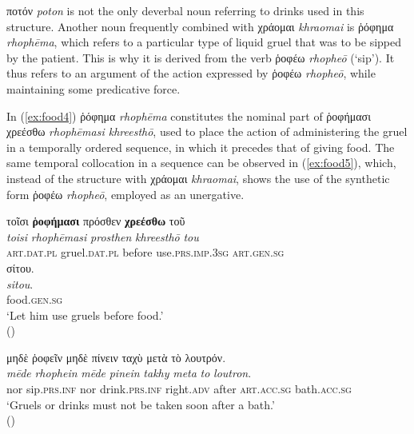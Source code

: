 \documentclass[output=paper,colorlinks,citecolor=brown]{langscibook}
\begin{document}
ποτόν \textit{poton} is not the only deverbal noun referring to drinks used in this structure. Another  noun frequently combined with χράομαι \textit{khraomai} is ῥόφημα \textit{rhophēma}, which refers to a particular type of liquid gruel that was to be sipped by the patient. This is why it is derived from the verb ῥοφέω \textit{rhopheō} (‘sip’). It thus refers to an argument of the action expressed by ῥοφέω \textit{rhopheō}, while maintaining some predicative force. 

In (\ref{ex:food4}) ῥόφημα \textit{rhophēma} constitutes the nominal part of ῥοφήμασι χρεέσθω \textit{rhophēmasi khreesthō}, used to place the action of administering the gruel in a temporally ordered sequence, in which it precedes that of giving food. The same temporal collocation in a sequence can be observed in (\ref{ex:food5}), which, instead of the structure with χράομαι \textit{khraomai}, shows the use of the synthetic form ῥοφέω \textit{rhopheō}, employed as an unergative. 

\begin{exe}
\ex\label{ex:food4}
\glll τοῖσι \textbf{ῥοφήμασι} πρόσθεν \textbf{χρεέσθω} τοῦ  \\ 
\textit{toisi} \textit{rhophēmasi} \textit{prosthen} \textit{khreesthō} \textit{tou} \\
\textsc{art.dat.pl} gruel.\textsc{dat.pl} before use.\textsc{prs.imp.3sg} \textsc{art.gen.sg}  \\

\glll σίτου. \\
\textit{sitou}. \\
food.\textsc{gen.sg} \\
\glt ‘Let him use gruels before food.' \\
\hspace*{\fill}()
\end{exe}

\begin{exe}
\ex\label{ex:food5}
\glll μηδὲ ῥοφεῖν μηδὲ πίνειν ταχὺ μετὰ τὸ λουτρόν. \\ 
\textit{mēde} \textit{rhophein} \textit{mēde} \textit{pinein} \textit{takhy} \textit{meta} \textit{to} \textit{loutron}.\\
nor sip.\textsc{prs.inf} nor drink.\textsc{prs.inf} right.\textsc{adv} after \textsc{art.acc.sg} bath.\textsc{acc.sg} \\
\glt ‘Gruels or drinks must not be taken soon after a bath.' \\
\hspace*{\fill}()
\end{exe}
\end{document}
